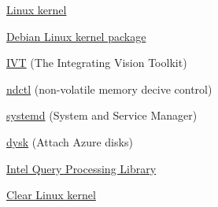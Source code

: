 \begin{loneinnerlist}
    \item \href{https://git.kernel.org/pub/scm/linux/kernel/git/torvalds/linux.git/log/?qt=author&q=Miguel+Bernal+Marin}
	    {Linux kernel}
    \item \href{https://salsa.debian.org/kernel-team/linux/-/commits/debian/latest?author=Miguel\%20Bernal\%20Marin}
	    {Debian Linux kernel package}
    \item \href{https://ivt.sourceforge.net/about.html}{IVT} (The Integrating
      Vision Toolkit)
    \item \href{https://github.com/pmem/ndctl/commits/?author=miguelinux}
      {ndctl} (non-volatile memory decive control)
    \item \href{https://github.com/systemd/systemd/commits?author=miguelinux}{systemd}
	    (System and Service Manager)
     \item \href{https://github.com/khenidak/dysk/commits/?author=miguelinux}
       {dysk} (Attach Azure disks)
    \item \href{https://github.com/intel/qpl/commits/?author=miguelinux}
      {Intel Query Processing Library }
    \item \href{https://github.com/clearlinux-pkgs/linux/commits/?author=miguelinux}
      {Clear Linux kernel}
\end{loneinnerlist}
